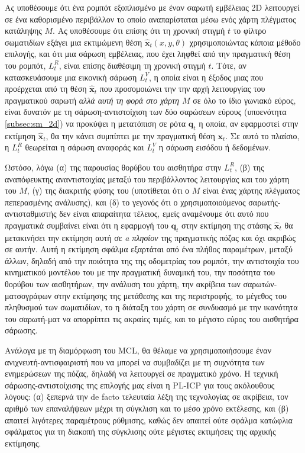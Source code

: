 Ας υποθέσουμε ότι ένα ρομπότ εξοπλισμένο με έναν σαρωτή εμβέλειας 2D λειτουργεί σε ένα
καθορισμένο περιβάλλον το οποίο αναπαρίσταται μέσω ενός χάρτη πλέγματος κατάληψης $M$. Ας υποθέσουμε ότι
επίσης ότι τη χρονική στιγμή $t$ το φίλτρο σωματιδίων εξάγει μια εκτιμώμενη θέση
$\hat{\bm{x}}_t(x,y,\theta)$ χρησιμοποιώντας κάποια μέθοδο επιλογής, και ότι μια σάρωση εμβέλειας,
που έχει ληφθεί από την πραγματική θέση του ρομπότ, $L_t^R$, είναι επίσης διαθέσιμη τη χρονική στιγμή
$t$. Τότε, αν κατασκευάσουμε μια εικονική σάρωση $L_t^V$, η οποία είναι η έξοδος μιας
που προέρχεται από τη θέση $\hat{\bm{x}}_t$ που προσομοιώνει την
την αρχή λειτουργίας του πραγματικού σαρωτή \textit{αλλά αυτή τη φορά στο χάρτη
$M$} σε όλο το ίδιο γωνιακό εύρος, είναι δυνατόν με τη σάρωση-αντιστοίχιση των δύο
σαρώσεων εύρους (υποενότητα \ref{subsec:sm_2d}) να προκύψει η μετατόπιση σε ρότα
$\bm{q}_t$ η οποία, αν εφαρμοστεί στην εκτίμηση $\hat{\bm{x}}_t$, θα την κάνει
συμπίπτει με την πραγματική θέση $\bm{x}_t$. Σε αυτό το πλαίσιο, η $L_t^R$ θεωρείται
η σάρωση αναφοράς και $L_t^V$ η σάρωση εισόδου ή δεδομένων.

Ωστόσο, λόγω (α) της παρουσίας θορύβου του αισθητήρα στην $L_t^R$, (β) της
αναπόφευκτης αναντιστοιχίας μεταξύ του περιβάλλοντος λειτουργίας και του χάρτη του $M$, (γ)
της διακριτής φύσης του (υποτίθεται ότι ο $M$ είναι ένας χάρτης πλέγματος πεπερασμένης ανάλυσης),
και (δ) το γεγονός ότι ο χρησιμοποιούμενος σαρωτής-αντισταθμιστής δεν είναι απαραίτητα τέλειος, εμείς
αναμένουμε ότι αυτό που πραγματικά συμβαίνει είναι ότι η εφαρμογή του
$\bm{q}_t$ στην εκτίμηση της στάσης $\hat{\bm{x}}_t$ θα μετακινήσει την εκτίμηση αυτή σε
\textit{a πλησίον} της πραγματικής πόζας και όχι ακριβώς σε αυτήν. Αυτή η εκτίμηση
σφάλμα εξαρτάται από ένα πλήθος παραμέτρων, μεταξύ άλλων, δηλαδή από την ποιότητα της
της οδομετρίας του ρομπότ, την αντιστοιχία του κινηματικού μοντέλου του με την πραγματική δυναμική του,
την ποσότητα του θορύβου των αισθητήρων, την ανάλυση του χάρτη, την ακρίβεια των σαρωτών-ματσογράφων στην
εκτίμησης της μετάθεσης και της περιστροφής, το μέγεθος του πληθυσμού των σωματιδίων, το
η διάταξη του χάρτη σε συνδυασμό με την ικανότητα του σαρωτή-ματ να απορρίπτει τις ακραίες τιμές,
και το μέγιστο εύρος του αισθητήρα σάρωσης.

Ανάλογα με τη διαμόρφωση του MCL, θα θέλαμε να χρησιμοποιήσουμε έναν ανιχνευτή-αντισφαιριστή
που να μπορεί να συμβαδίζει με τη συχνότητα των ενημερώσεων της πόζας, δηλαδή να λειτουργεί
σε πραγματικό χρόνο. Η τεχνική σάρωσης-αντιστοίχισης της επιλογής μας είναι η PL-ICP \cite{plicp}
για τους ακόλουθους λόγους: (α) ξεπερνά την de facto τελευταία λέξη της τεχνολογίας σε
ακρίβεια, τον αριθμό των επαναλήψεων μέχρι τη σύγκλιση και το μέσο χρόνο εκτέλεσης,
και (β) απαιτεί λιγότερες παραμέτρους ρύθμισης, καθώς δεν απαιτεί ούτε σφάλμα
κατώφλια σφάλματος για τη διακοπή της σύγκλισης ούτε μέγιστες εκτιμήσεις της αρχικής εκτίμησης.


